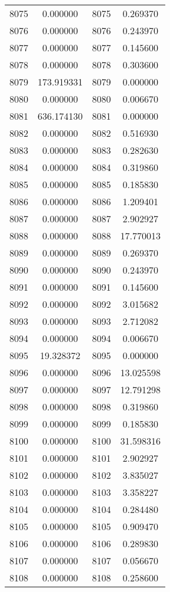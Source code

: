 \documentclass[12pt]{article}
\begin{document}
\begin{longtable}{@{}cccc@{}}
8075 & 0.000000 & 8075 & 0.269370 \\
8076 & 0.000000 & 8076 & 0.243970 \\
8077 & 0.000000 & 8077 & 0.145600 \\
8078 & 0.000000 & 8078 & 0.303600 \\
8079 & 173.919331 & 8079 & 0.000000 \\
8080 & 0.000000 & 8080 & 0.006670 \\
8081 & 636.174130 & 8081 & 0.000000 \\
8082 & 0.000000 & 8082 & 0.516930 \\
8083 & 0.000000 & 8083 & 0.282630 \\
8084 & 0.000000 & 8084 & 0.319860 \\
8085 & 0.000000 & 8085 & 0.185830 \\
8086 & 0.000000 & 8086 & 1.209401 \\
8087 & 0.000000 & 8087 & 2.902927 \\
8088 & 0.000000 & 8088 & 17.770013 \\
8089 & 0.000000 & 8089 & 0.269370 \\
8090 & 0.000000 & 8090 & 0.243970 \\
8091 & 0.000000 & 8091 & 0.145600 \\
8092 & 0.000000 & 8092 & 3.015682 \\
8093 & 0.000000 & 8093 & 2.712082 \\
8094 & 0.000000 & 8094 & 0.006670 \\
8095 & 19.328372 & 8095 & 0.000000 \\
8096 & 0.000000 & 8096 & 13.025598 \\
8097 & 0.000000 & 8097 & 12.791298 \\
8098 & 0.000000 & 8098 & 0.319860 \\
8099 & 0.000000 & 8099 & 0.185830 \\
8100 & 0.000000 & 8100 & 31.598316 \\
8101 & 0.000000 & 8101 & 2.902927 \\
8102 & 0.000000 & 8102 & 3.835027 \\
8103 & 0.000000 & 8103 & 3.358227 \\
8104 & 0.000000 & 8104 & 0.284480 \\
8105 & 0.000000 & 8105 & 0.909470 \\
8106 & 0.000000 & 8106 & 0.289830 \\
8107 & 0.000000 & 8107 & 0.056670 \\
8108 & 0.000000 & 8108 & 0.258600 \\

\end{longtable}
\end{document}
